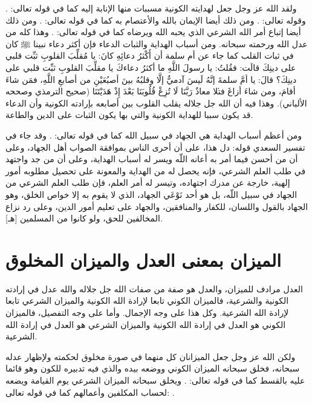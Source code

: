 ولقد الله عز وجل جعل لهدايته الكونية مسببات منها الإنابة إليه كما في قوله تعالى:
\quranayah*[42][13][30]{\footnotesize \surahname*[42]}. وقوله تعالى:
\quranayah*[13][27]{\footnotesize \surahname*[13]}.
ومن ذلك أيضا الإيمان بالله والأعتصام به كما في قوله تعالى:
\quranayah*[4][175]{\footnotesize \surahname*[4]}. ومن ذلك أيضا إتباع أمر الله الشرعي الذي يحبه الله ويرضاه كما في قوله تعالى:
\quranayah*[5][16]{\footnotesize \surahname*[5]}.  وهذا كله من عدل الله ورحمته سبحانه. ومن أسباب الهداية والثبات الدعاء فإن أكثر دعاء نبينا ﷺ كان في ثبات القلب كما جاء عن أم سلمة أن أَكْثرُ دعائِهِ كانَ: يا مُقلِّبَ القلوبِ ثبِّت قلبي على دينِكَ قالَت: فقُلتُ: يا رسولَ اللَّهِ ما أكثرُ دعاءكَ يا مقلِّبَ القلوبِ ثبِّت قلبي على دينِكَ؟ قالَ: يا أمَّ سلمةَ إنَّهُ لَيسَ آدميٌّ إلَّا وقلبُهُ بينَ أصبُعَيْنِ من أصابعِ اللَّهِ، فمَن شاءَ أقامَ، ومن شاءَ أزاغَ \.فتلا معاذٌ رَبَّنَا لَا تُزِغْ قُلُوبَنَا بَعْدَ إِذْ هَدَيْتَنَا {\footnotesize (صحيح الترمذي وصححه الألباني)}. وهذا فيه أن الله جل جلاله يقلب القلوب بين أصابعه بإرادته الكونية وأن الدعاء قد يكون سببا للهداية الكونية والتي بها يكون الثبات على الدين والطاعة.  

ومن أعظم أسباب الهداية هي الجهاد في سبيل الله كما في قوله تعالى:  \quranayah*[29][69]{\footnotesize \surahname*[29]}. وقد جاء في تفسير السعدي قوله: دل هذا، على أن أحرى الناس بموافقة الصواب أهل الجهاد، وعلى أن من أحسن فيما أمر به أعانه اللّه ويسر له أسباب الهداية، وعلى أن من جد واجتهد في طلب العلم الشرعي، فإنه يحصل له من الهداية والمعونة على تحصيل مطلوبه أمور إلهية، خارجة عن مدرك اجتهاده، وتيسر له أمر العلم، فإن طلب العلم الشرعي من الجهاد في سبيل اللّه، بل هو أحد نَوْعَي الجهاد، الذي لا يقوم به إلا خواص الخلق، وهو الجهاد بالقول واللسان، للكفار والمنافقين، والجهاد على تعليم أمور الدين، وعلى رد نزاع المخالفين للحق، ولو كانوا من المسلمين [هـ].

\section{الميزان بمعنى العدل والميزان المخلوق}

 العدل مرادف للميزان، والعدل هو صفة من صفات الله جل جلاله والله عدل في إرادته الكونية والشرعية، فالميزان الكوني تابعا لإرادة الله الكونية والميزان الشرعي تابعا لإرادة الله الشرعية. وكل هذا على وجه الإجمال. وأما على وجه التفصيل، فالميزان الكوني هو العدل في إرادة الله الكونية والميزان الشرعي هو العدل في إرادة الله الشرعية. 

ولكن الله عز وجل جعل الميزانان كل منهما في صورة مخلوق لحكمته ولإظهار عدله سبحانه، فخلق سبحانه الميزان الكوني ووضعه بيده والذي فيه تدبيره للكون وهو قائما عليه بالقسط كما في قوله تعالى:
\quranayah*[3][18]{\footnotesize \surahname*[3]}. ويخلق سبحانه الميزان الشرعي يوم القيامة ويضعه لحساب المكلفين وأعمالهم كما في قوله تعالى: 
\quranayah*[21][47]{\footnotesize \surahname*[21]}.

